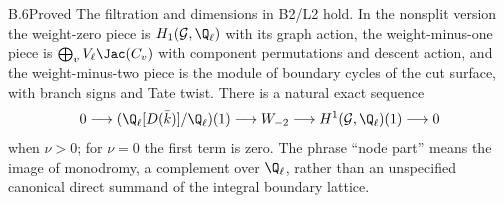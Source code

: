 \begin{claim}{B.6}{Proved}
The filtration and dimensions in B2/L2 hold. In the nonsplit version the
weight-zero piece is $H_1(\mathcal G,\Q_\ell)$ with its graph action, the
weight-minus-one piece is $\bigoplus_vV_\ell\Jac(C_v)$ with component
permutations and descent action, and the weight-minus-two piece is the
module of boundary cycles of the cut surface, with branch signs and Tate
twist. There is a natural exact sequence
\[
 0\longrightarrow
 (\Q_\ell[D(\bar k)]/\Q_\ell)(1)
 \longrightarrow W_{-2}\longrightarrow H^1(\mathcal G,\Q_\ell)(1)
 \longrightarrow0
\]
when $\nu>0$; for $\nu=0$ the first term is zero. The phrase ``node part''
means the image of monodromy, a complement over $\Q_\ell$, rather than an
unspecified canonical direct summand of the integral boundary lattice.
\end{claim}
